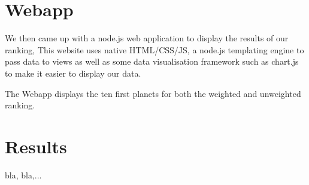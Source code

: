 \documentclass[12p]{article}
\begin{document}

\section{Webapp}
We then came up with a node.js web application to display the results of our ranking, This website uses native HTML/CSS/JS, a node.js templating engine to pass data to views as well as some data visualisation framework such as chart.js to make it easier to display our data.

The Webapp displays the ten first planets for both the weighted and unweighted ranking.


\section{Results}
bla, bla,...


\printbibliography

\appendix
\end{document}
